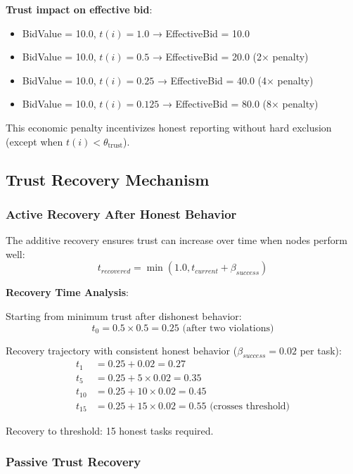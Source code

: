 \documentclass[12pt,a4paper]{article}
\begin{document}
\textbf{Trust impact on effective bid}:
\begin{itemize}
    \item BidValue = 10.0, $t(i) = 1.0$ → EffectiveBid = 10.0
    \item BidValue = 10.0, $t(i) = 0.5$ → EffectiveBid = 20.0 (2× penalty)
    \item BidValue = 10.0, $t(i) = 0.25$ → EffectiveBid = 40.0 (4× penalty)
    \item BidValue = 10.0, $t(i) = 0.125$ → EffectiveBid = 80.0 (8× penalty)
\end{itemize}

This economic penalty incentivizes honest reporting without hard exclusion (except when $t(i) < \theta_{\text{trust}}$).

\subsection{Trust Recovery Mechanism}

\subsubsection{Active Recovery After Honest Behavior}

The additive recovery ensures trust can increase over time when nodes perform well:
\begin{equation}
    t_{recovered} = \min(1.0, t_{current} + \beta_{success})
\end{equation}

\textbf{Recovery Time Analysis}:

Starting from minimum trust after dishonest behavior:
\begin{equation}
    t_0 = 0.5 \times 0.5 = 0.25 \text{ (after two violations)}
\end{equation}

Recovery trajectory with consistent honest behavior ($\beta_{success} = 0.02$ per task):
\begin{align}
    t_1 &= 0.25 + 0.02 = 0.27 \\
    t_5 &= 0.25 + 5 \times 0.02 = 0.35 \\
    t_{10} &= 0.25 + 10 \times 0.02 = 0.45 \\
    t_{15} &= 0.25 + 15 \times 0.02 = 0.55 \text{ (crosses threshold)}
\end{align}

Recovery to threshold: 15 honest tasks required.

\subsubsection{Passive Trust Recovery}
\end{document}
